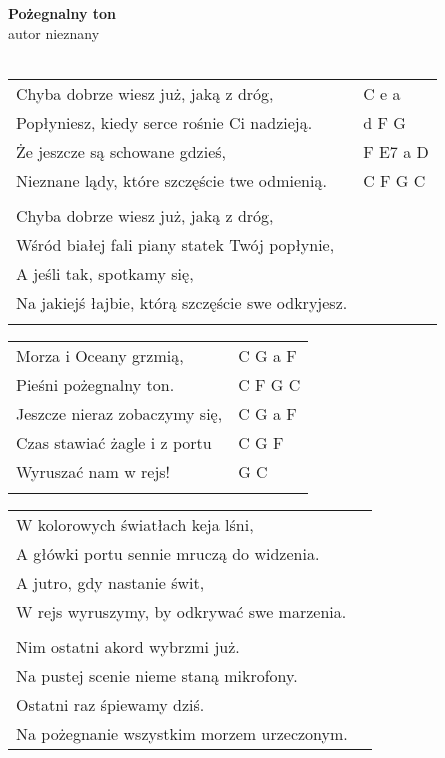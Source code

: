 \documentclass[a5paper]{article}
\begin{document}


\noindent
\fontsize{12pt}{15pt}\selectfont
\textbf{Pożegnalny ton} \\
\fontsize{8pt}{10pt}\selectfont
autor nieznany \\ \\
\fontsize{10pt}{12pt}\selectfont
{}
\begin{tabular}{@{}p{8.00cm}p{3cm}@{}}
\noindent
Chyba dobrze wiesz już, jaką z dróg, & C e a \\
Popłyniesz, kiedy serce rośnie Ci nadzieją. & d F G \\
Że jeszcze są schowane gdzieś, & F E7 a D \\
Nieznane lądy, które szczęście twe odmienią. & C F G C \\ \\

Chyba dobrze wiesz już, jaką z dróg, \\
Wśród białej fali piany statek Twój popłynie, \\
A jeśli tak, spotkamy się, \\
Na jakiejś łajbie, którą szczęście swe odkryjesz. \\ \\
\end{tabular}

\noindent
\begin{tabular}{@{}p{7.00cm}p{3cm}@{}}
Morza i Oceany grzmią, & C G a F \\
Pieśni pożegnalny ton. & C F G C \\
Jeszcze nieraz zobaczymy się, & C G a F \\
Czas stawiać żagle i z portu & C G F \\
Wyruszać nam w rejs! & G C \\ \\
\end{tabular}

\noindent
\begin{tabular}{@{}p{10.00cm}p{3cm}@{}}
W kolorowych światłach keja lśni, \\
A główki portu sennie mruczą do widzenia. \\
A jutro, gdy nastanie świt, \\
W rejs wyruszymy, by odkrywać swe marzenia. \\ \\

Nim ostatni akord wybrzmi już. \\
Na pustej scenie nieme staną mikrofony. \\
Ostatni raz śpiewamy dziś. \\
Na pożegnanie wszystkim morzem urzeczonym.
\end{tabular}
\end{document}
